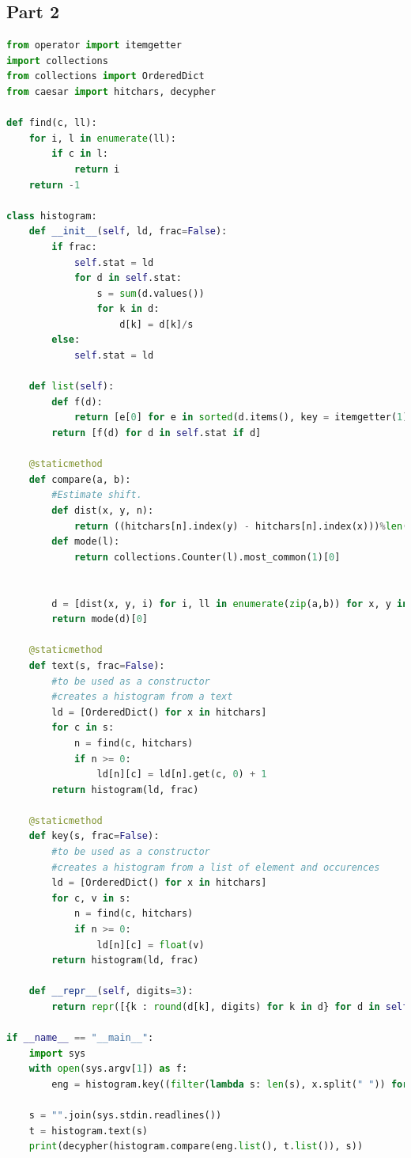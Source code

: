 \documentclass[a4paper,10pt]{article}
\begin{document}
\subsection{Part 2}
\begin{lstlisting}[language=python]
from operator import itemgetter
import collections
from collections import OrderedDict
from caesar import hitchars, decypher

def find(c, ll):
    for i, l in enumerate(ll):
        if c in l:
            return i
    return -1

class histogram:
    def __init__(self, ld, frac=False):
        if frac:
            self.stat = ld
            for d in self.stat:
                s = sum(d.values())
                for k in d:
                    d[k] = d[k]/s
        else:
            self.stat = ld

    def list(self):
        def f(d):
            return [e[0] for e in sorted(d.items(), key = itemgetter(1), reverse = True)]
        return [f(d) for d in self.stat if d]

    @staticmethod
    def compare(a, b):
        #Estimate shift.
        def dist(x, y, n):
            return ((hitchars[n].index(y) - hitchars[n].index(x)))%len(hitchars[n])
        def mode(l):
            return collections.Counter(l).most_common(1)[0]


        d = [dist(x, y, i) for i, ll in enumerate(zip(a,b)) for x, y in zip(ll[0], ll[1])]
        return mode(d)[0]

    @staticmethod
    def text(s, frac=False):
        #to be used as a constructor
        #creates a histogram from a text
        ld = [OrderedDict() for x in hitchars]
        for c in s:
            n = find(c, hitchars)
            if n >= 0:
                ld[n][c] = ld[n].get(c, 0) + 1
        return histogram(ld, frac)

    @staticmethod
    def key(s, frac=False):
        #to be used as a constructor
        #creates a histogram from a list of element and occurences
        ld = [OrderedDict() for x in hitchars]
        for c, v in s:
            n = find(c, hitchars)
            if n >= 0:
                ld[n][c] = float(v)
        return histogram(ld, frac)

    def __repr__(self, digits=3):
        return repr([{k : round(d[k], digits) for k in d} for d in self.stat if d])

if __name__ == "__main__":
    import sys
    with open(sys.argv[1]) as f:
        eng = histogram.key((filter(lambda s: len(s), x.split(" ")) for x in f))

    s = "".join(sys.stdin.readlines())
    t = histogram.text(s)
    print(decypher(histogram.compare(eng.list(), t.list()), s))
\end{lstlisting}
\end{document}
